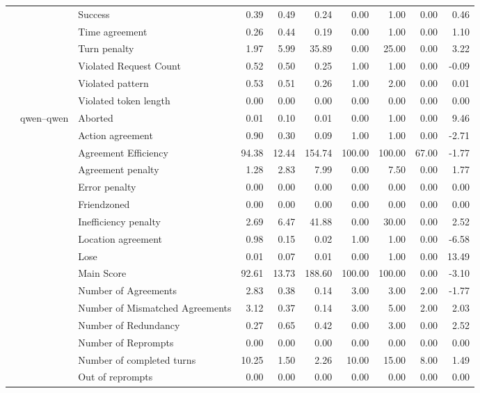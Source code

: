 \begin{tabular}{lllrrrrrrr}
 &  & Success & 0.39 & 0.49 & 0.24 & 0.00 & 1.00 & 0.00 & 0.46 \\
 &  & Time agreement & 0.26 & 0.44 & 0.19 & 0.00 & 1.00 & 0.00 & 1.10 \\
 &  & Turn penalty & 1.97 & 5.99 & 35.89 & 0.00 & 25.00 & 0.00 & 3.22 \\
 &  & Violated Request Count & 0.52 & 0.50 & 0.25 & 1.00 & 1.00 & 0.00 & -0.09 \\
 &  & Violated pattern & 0.53 & 0.51 & 0.26 & 1.00 & 2.00 & 0.00 & 0.01 \\
 &  & Violated token length & 0.00 & 0.00 & 0.00 & 0.00 & 0.00 & 0.00 & 0.00 \\
\cline{2-10}
 & \multirow[t]{27}{*}{qwen--qwen} & Aborted & 0.01 & 0.10 & 0.01 & 0.00 & 1.00 & 0.00 & 9.46 \\
 &  & Action agreement & 0.90 & 0.30 & 0.09 & 1.00 & 1.00 & 0.00 & -2.71 \\
 &  & Agreement Efficiency & 94.38 & 12.44 & 154.74 & 100.00 & 100.00 & 67.00 & -1.77 \\
 &  & Agreement penalty & 1.28 & 2.83 & 7.99 & 0.00 & 7.50 & 0.00 & 1.77 \\
 &  & Error penalty & 0.00 & 0.00 & 0.00 & 0.00 & 0.00 & 0.00 & 0.00 \\
 &  & Friendzoned & 0.00 & 0.00 & 0.00 & 0.00 & 0.00 & 0.00 & 0.00 \\
 &  & Inefficiency penalty & 2.69 & 6.47 & 41.88 & 0.00 & 30.00 & 0.00 & 2.52 \\
 &  & Location agreement & 0.98 & 0.15 & 0.02 & 1.00 & 1.00 & 0.00 & -6.58 \\
 &  & Lose & 0.01 & 0.07 & 0.01 & 0.00 & 1.00 & 0.00 & 13.49 \\
 &  & Main Score & 92.61 & 13.73 & 188.60 & 100.00 & 100.00 & 0.00 & -3.10 \\
 &  & Number of Agreements & 2.83 & 0.38 & 0.14 & 3.00 & 3.00 & 2.00 & -1.77 \\
 &  & Number of Mismatched Agreements & 3.12 & 0.37 & 0.14 & 3.00 & 5.00 & 2.00 & 2.03 \\
 &  & Number of Redundancy & 0.27 & 0.65 & 0.42 & 0.00 & 3.00 & 0.00 & 2.52 \\
 &  & Number of Reprompts & 0.00 & 0.00 & 0.00 & 0.00 & 0.00 & 0.00 & 0.00 \\
 &  & Number of completed turns & 10.25 & 1.50 & 2.26 & 10.00 & 15.00 & 8.00 & 1.49 \\
 &  & Out of reprompts & 0.00 & 0.00 & 0.00 & 0.00 & 0.00 & 0.00 & 0.00 \\

\end{tabular}
